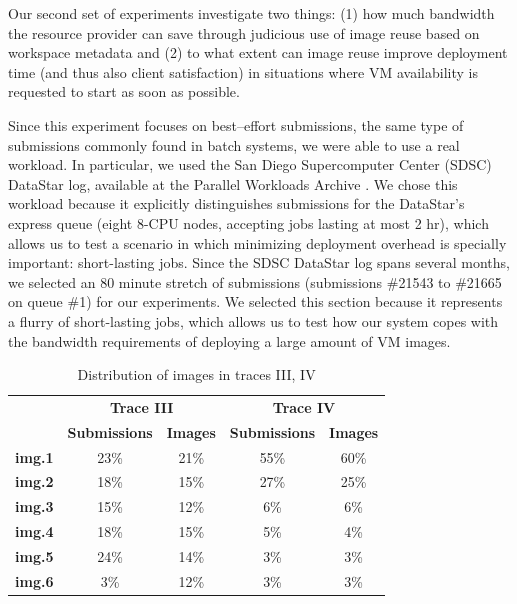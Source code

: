 Our second set of experiments investigate two things: (1) how much bandwidth the resource provider can save through
judicious use of image reuse based on workspace metadata and (2) to
what extent can image reuse improve deployment time (and thus also
client satisfaction) in situations where VM availability is requested
to start as soon as possible.

Since this experiment focuses on best--effort submissions, the same type of
submissions commonly found in batch systems, we were able to use a real
workload. In particular, we used the San Diego Supercomputer Center
(SDSC) DataStar log, available at the Parallel Workloads Archive \cite{BorjaCite21}.
We chose this workload because it explicitly distinguishes submissions
for the DataStar's express queue (eight 8{}-CPU nodes, accepting jobs
lasting at most 2 hr), which allows us to test a scenario in which
minimizing deployment overhead is specially important: short{}-lasting
jobs. Since the SDSC DataStar log spans several months, we selected an
80 minute stretch of submissions (submissions \#21543 to \#21665 on
queue \#1) for our experiments. We selected this section
because it represents a flurry of short{}-lasting jobs, which
allows us to test how our system copes with the bandwidth requirements
of deploying a large amount of VM images.


\begin{table}
\begin{center}
\caption{Distribution of images in traces III, IV}
\begin{tabular}{|c|c|c|c|c|}
\cline{2-5}
\multicolumn{1}{c|}{} &
\multicolumn{2}{c|}{\bfseries Trace III} &
\multicolumn{2}{c|}{\bfseries Trace IV}

\\\cline{2-5}

\multicolumn{1}{c|}{}  & {\bfseries Submissions} & {\bfseries Images} & {\bfseries Submissions} & {\bfseries Images} 

\\\hline

{\bfseries img.1} & 23\% & 21\% & 55\% & 60\%

\\\hline

{\bfseries img.2}
&
18\%
&
15\%
&
27\%
&
25\%

\\\hline

{\bfseries img.3}

&
15\%
&
12\%
&
6\%
&
6\%

\\\hline

{\bfseries img.4}
&
18\% 
&
15\%
&
5\%
&
4\%

\\\hline

{\bfseries img.5}
&
24\%
&
14\%
&
3\%
&
3\%

\\\hline

{\bfseries img.6}
&
3\%
&
12\%
&
3\%
&
3\%

\\\hline
\end{tabular}
\label{tab:imagedistro}
\end{center}
\end{table}

